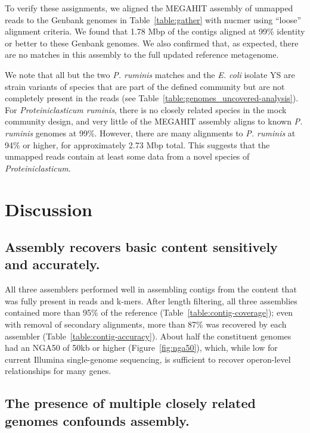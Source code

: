 \documentclass[11pt]{article}
\begin{document}
To verify these assignments, we aligned the MEGAHIT assembly of
unmapped reads to the Genbank genomes in Table~\ref{table:gather} with
nucmer using ``loose'' alignment criteria. We found that 1.78 Mbp of
the contigs aligned at 99\% identity or better to these Genbank
genomes.  We also confirmed that, as expected, there are no matches in
this assembly to the full updated reference metagenome.

We note that all but the two {\em P. ruminis} matches and the {\em
  E. coli} isolate YS are strain variants of species that are part of
the defined community but are not completely present in the reads (see
Table~\ref{table:genomes_uncovered-analysis}).  For {\em
  Proteiniclasticum ruminis}, there is no closely related species in
the mock community design, and very little of the MEGAHIT assembly
aligns to known {\em P. ruminis} genomes at 99\%.  However, there are
many alignments to {\em P. ruminis} at 94\% or higher, for
approximately 2.73 Mbp total.  This suggests that the unmapped reads
contain at least some data from a novel species of {\em
  Proteiniclasticum}.

\section*{Discussion}

\subsection*{Assembly recovers basic content sensitively and accurately.}

All three assemblers performed well in assembling contigs from the
content that was fully present in reads and k-mers.  After length filtering,
all three assemblies contained more than 95\% of the reference
(Table~\ref{table:contig-coverage}); even with removal of secondary
alignments, more than 87\% was recovered by each assembler
(Table~\ref{table:contig-accuracy}). About half the constituent genomes had
an NGA50 of 50kb or higher (Figure~\ref{fig:nga50}),
which, while low for current Illumina single-genome sequencing,
is sufficient to recover operon-level relationships for many genes.



\subsection*{The presence of multiple closely related genomes confounds assembly.}
\end{document}
